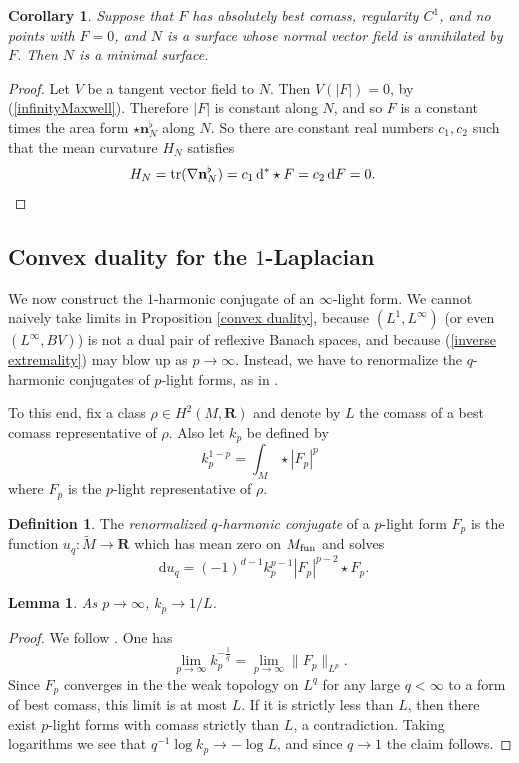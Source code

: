 \documentclass[reqno,11pt]{amsart}
\newcommand{\RR}{\mathbf{R}}
\newcommand*\dif{\mathop{}\!\mathrm{d}}
\DeclareMathOperator{\tr}{tr}
\newcommand{\normal}{\mathbf n}
\newcommand{\dfn}[1]{\emph{#1}\index{#1}}
\newtheorem{lemma}[theorem]{Lemma}
\newtheorem{corollary}[theorem]{Corollary}
\theoremstyle{definition}
\newtheorem{definition}[theorem]{Definition}
\numberwithin{equation}{section}
\begin{document}
\begin{corollary}
Suppose that $F$ has absolutely best comass, regularity $C^1$, and no points with $F = 0$, and $N$ is a surface whose normal vector field is annihilated by $F$.
Then $N$ is a minimal surface.
\end{corollary}
\begin{proof}
Let $V$ be a tangent vector field to $N$. Then $V(|F|) = 0$, by (\ref{infinityMaxwell}).
Therefore $|F|$ is constant along $N$, and so $F$ is a constant times the area form $\star \normal_N^\flat$ along $N$.
So there are constant real numbers $c_1, c_2$ such that the mean curvature $H_N$ satisfies
\begin{align*}
H_N &= \tr(\nabla \normal_N^\flat) = c_1 \dif^* \star F = c_2 \dif F = 0. \qedhere
\end{align*}
\end{proof}


\subsection{\texorpdfstring{Convex duality for the $1$-Laplacian}{Convex duality of for the one-Laplacian}}
We now construct the $1$-harmonic conjugate of an $\infty$-light form.
We cannot naively take limits in Proposition \ref{convex duality}, because $(L^1, L^\infty)$ (or even $(L^\infty, BV)$) is not a dual pair of reflexive Banach spaces, and because (\ref{inverse extremality}) may blow up as $p \to \infty$.
Instead, we have to renormalize the $q$-harmonic conjugates of $p$-light forms, as in \cite[\S3.2]{daskalopoulos2020transverse}.

To this end, fix a class $\rho \in H^2(M, \RR)$ and denote by $L$ the comass of a best comass representative of $\rho$.
Also let $k_p$ be defined by 
$$k_p^{1 - p} = \int_M \star |F_p|^p$$
where $F_p$ is the $p$-light representative of $\rho$.

\begin{definition}
The \dfn{renormalized $q$-harmonic conjugate} of a $p$-light form $F_p$ is the function $u_q: \tilde M \to \RR$ which has mean zero on $M_{\rm fun}$ and solves
$$\dif u_q = (-1)^{d - 1} k_p^{p - 1} |F_p|^{p - 2} \star F_p.$$
\end{definition}

\begin{lemma}\label{normalizations converge}
As $p \to \infty$, $k_p \to 1/L$.
\end{lemma}
\begin{proof}
We follow \cite[Lemma 3.4]{daskalopoulos2020transverse}.
One has 
$$\lim_{p \to \infty} k_p^{-\frac{1}{q}} = \lim_{p \to \infty} \|F_p\|_{L^p}.$$
Since $F_p$ converges in the the weak topology on $L^q$ for any large $q < \infty$ to a form of best comass, this limit is at most $L$.
If it is strictly less than $L$, then there exist $p$-light forms with comass strictly than $L$, a contradiction.
Taking logarithms we see that $q^{-1} \log k_p \to -\log L$, and since $q \to 1$ the claim follows.
\end{proof}
\end{document}
